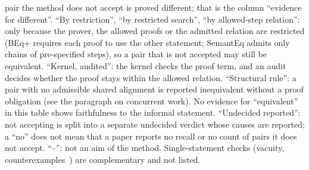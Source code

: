 \documentclass[10pt]{article}
\theoremstyle{definition}
\begin{document}
\begin{table}[t]
{pair the method does not accept is proved different; that is the column ``evidence for
different''. ``By restriction'', ``by restricted search'', ``by allowed-step relation'': only
because the prover, the allowed proofs or the admitted relation are restricted (BEq+ requires each
proof to use the other statement; SemantEq admits only chains of pre-specified steps), so a pair
that is not accepted may still be equivalent. ``Kernel, audited'': the kernel checks the proof
term, and an audit decides whether the proof stays within the allowed relation. ``Structural
rule'': a pair with no admissible shared alignment is reported inequivalent without a proof
obligation (see the paragraph on concurrent work). No evidence for
``equivalent'' in this table shows faithfulness to the informal statement. ``Undecided
reported'': not accepting is split into a separate undecided verdict whose causes are reported;
a ``no'' does not mean that a paper reports no recall or no count of pairs it does not accept.
``--'': not an aim of the method.
Single-statement checks (vacuity, counterexamples~\cite{faults,meidouglas}) are complementary and
not listed.}
\label{tab:related}
\end{table}
\end{document}

